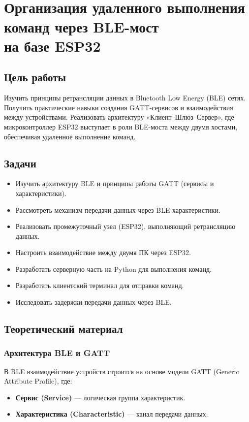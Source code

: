 \section[Организация удаленного выполнения команд через BLE-мост на базе ESP32]
{\\Организация удаленного выполнения команд через BLE-мост \\ на базе ESP32}

\subsection{Цель работы}
Изучить принципы ретрансляции данных в Bluetooth Low Energy (BLE) сетях. Получить практические навыки создания GATT-сервисов и взаимодействия между устройствами. Реализовать архитектуру «Клиент–Шлюз–Сервер», где микроконтроллер ESP32 выступает в роли BLE-моста между двумя хостами, обеспечивая удаленное выполнение команд.

\subsection{Задачи}
\begin{itemize}[nosep]
    \item Изучить архитектуру BLE и принципы работы GATT (сервисы и характеристики).
    \item Рассмотреть механизм передачи данных через BLE-характеристики.
    \item Реализовать промежуточный узел (ESP32), выполняющий ретрансляцию данных.
    \item Настроить взаимодействие между двумя ПК через ESP32.
    \item Разработать серверную часть на Python для выполнения команд.
    \item Разработать клиентский терминал для отправки команд.
    \item Исследовать задержки передачи данных через BLE.
\end{itemize}

\subsection{Теоретический материал}

\subsubsection{Архитектура BLE и GATT}
В BLE взаимодействие устройств строится на основе модели GATT (Generic Attribute Profile), где:
\begin{itemize}
    \item \textbf{Сервис (Service)} — логическая группа характеристик.
    \item \textbf{Характеристика (Characteristic)} — канал передачи данных.
\end{itemize}

